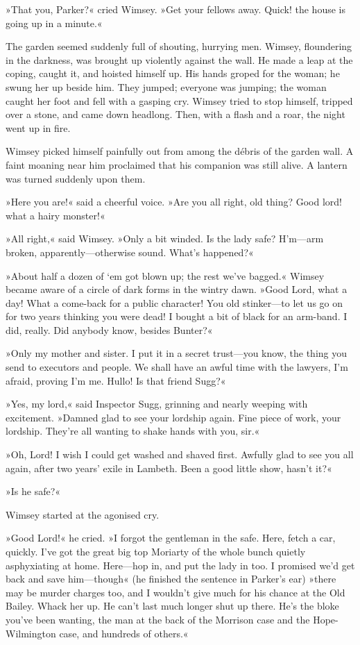 »That you, Parker?« cried Wimsey. »Get your fellows away. Quick! the house is going up in a minute.«

The garden seemed suddenly full of shouting, hurrying men. Wimsey, floundering in the darkness, was brought up violently against the wall. He made a leap at the coping, caught it, and hoisted himself up. His hands groped for the woman; he swung her up beside him. They jumped; everyone was jumping; the woman caught her foot and fell with a gasping cry. Wimsey tried to stop himself, tripped over a stone, and came down headlong. Then, with a flash and a roar, the night went up in fire.

Wimsey picked himself painfully out from among the débris of the garden wall. A faint moaning near him proclaimed that his companion was still alive. A lantern was turned suddenly upon them.

»Here you are!« said a cheerful voice. »Are you all right, old thing? Good lord! what a hairy monster!«

»All right,« said Wimsey. »Only a bit winded. Is the lady safe? H'm—arm broken, apparently—otherwise sound. What's happened?«

»About half a dozen of `em got blown up; the rest we've bagged.« Wimsey became aware of a circle of dark forms in the wintry dawn. »Good Lord, what a day! What a come-back for a public character! You old stinker—to let us go on for two years thinking you were dead! I bought a bit of black for an arm-band. I did, really. Did anybody know, besides Bunter?«

»Only my mother and sister. I put it in a secret trust—you know, the thing you send to executors and people. We shall have an awful time with the lawyers, I'm afraid, proving I'm me. Hullo! Is that friend Sugg?«

»Yes, my lord,« said Inspector Sugg, grinning and nearly weeping with excitement. »Damned glad to see your lordship again. Fine piece of work, your lordship. They're all wanting to shake hands with you, sir.«

»Oh, Lord! I wish I could get washed and shaved first. Awfully glad to see you all again, after two years' exile in Lambeth. Been a good little show, hasn't it?«

»Is he safe?«

Wimsey started at the agonised cry.

»Good Lord!« he cried. »I forgot the gentleman in the safe. Here, fetch a car, quickly. I've got the great big top Moriarty of the whole bunch quietly asphyxiating at home. Here—hop in, and put the lady in too. I promised we'd get back and save him—though« (he finished the sentence in Parker's ear) »there may be murder charges too, and I wouldn't give much for his chance at the Old Bailey. Whack her up. He can't last much longer shut up there. He's the bloke you've been wanting, the man at the back of the Morrison case and the Hope-Wilmington case, and hundreds of others.«

